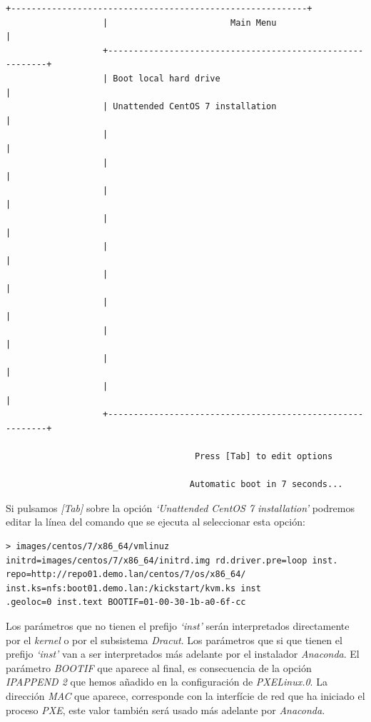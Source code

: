 \documentclass[a4paper,12pt,spanish,final]{epsc_tfc_pfc}
\begin{document}
\begin{lstlisting}[style=dnsmasq]
                   +----------------------------------------------------------+
                   |                        Main Menu                         |
                   +----------------------------------------------------------+
                   | Boot local hard drive                                    |
                   | Unattended CentOS 7 installation                         |
                   |                                                          |
                   |                                                          |
                   |                                                          |
                   |                                                          |
                   |                                                          |
                   |                                                          |
                   |                                                          |
                   |                                                          |
                   |                                                          |
                   |                                                          |
                   +----------------------------------------------------------+

                                     Press [Tab] to edit options

                                    Automatic boot in 7 seconds...
\end{lstlisting}

Si pulsamos \emph{[Tab]} sobre la opción \emph{`Unattended CentOS 7 installation'} podremos editar la línea del comando que se ejecuta al seleccionar esta opción:\\

\begin{lstlisting}[style=dnsmasq]
> images/centos/7/x86_64/vmlinuz initrd=images/centos/7/x86_64/initrd.img rd.driver.pre=loop inst.
repo=http://repo01.demo.lan/centos/7/os/x86_64/ inst.ks=nfs:boot01.demo.lan:/kickstart/kvm.ks inst
.geoloc=0 inst.text BOOTIF=01-00-30-1b-a0-6f-cc
\end{lstlisting}

Los parámetros que no tienen el prefijo \emph{`inst'} serán interpretados directamente por el \emph{kernel} o por el subsistema \emph{Dracut}. Los parámetros que si que tienen el prefijo \emph{`inst'} van a ser interpretados más adelante por el instalador \emph{Anaconda}. El parámetro \emph{BOOTIF} que aparece al final, es consecuencia de la opción \emph{IPAPPEND 2} que hemos añadido en la configuración de \emph{PXELinux.0}. La dirección \emph{MAC} que aparece, corresponde con la interfície de red que ha iniciado el proceso \emph{PXE}, este valor también será usado más adelante por \emph{Anaconda}.
\end{document}
